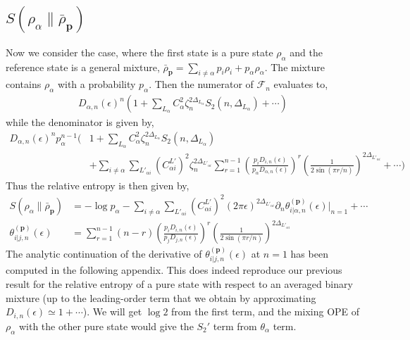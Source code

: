 \documentclass[11pt]{article}
\newcommand{\ep}{\epsilon}
\newcommand{\p}{\partial}
\newcommand{\nn}{\nonumber}
\newcommand{\lb}{\left(}
\newcommand{\rb}{\right)}
\begin{document}
\subsection{\texorpdfstring{$S(\rho_\alpha\|\bar{\rho}_\textbf{p})$}{S rho alpha wrt rho bar p}}
Now we consider the case, where the first state is a pure state $\rho_\alpha$ and the reference state is a general mixture, $\bar\rho_\textbf{p} =\displaystyle \sum_{i\neq \alpha} p_i\rho_i + p_\alpha \rho_\alpha$. The mixture contains $\rho_\alpha$ with a probability $p_\alpha$. 
Then the numerator of $\mathcal{F}_n$ evaluates to,
\begin{align}
    D_{\alpha,n}(\ep)^n \displaystyle\lb 1+ \sum_{L_{\alpha}}C_\alpha^2 \zeta_n^{2\Delta_{L_\alpha}}S_2(n,\Delta_{L_{\alpha}})+\cdots\rb
\end{align}
while the denominator is given by,
\begin{align}
    D_{\alpha,n}(\ep)^n p_\alpha^{n-1}\displaystyle\Bigg( &1 + \sum_{L_{\alpha}}C_\alpha^2 \zeta_n^{2\Delta_{L_{\alpha}}}S_2(n,\Delta_{L_{\alpha}}) \nn\\
    &+ \displaystyle\sum_{i\neq \alpha}\sum_{L'_{\alpha i}}\lb C_{\alpha i}^{L'}\rb^2\zeta_n^{2\Delta_{L'_{\alpha i}}} \sum_{r=1}^{n-1} \lb\frac{p_iD_{i,n}(\ep)}{p_\alpha D_{\alpha,n}(\ep)}\rb^{r} \lb\frac{1}{2\sin(\pi r/n)}\rb^{2\Delta_{L'_{\alpha i}}} +\cdots \Bigg)
\end{align}
Thus the relative entropy is then given by,
\begin{align}
    S(\rho_\alpha \| \bar\rho_\textbf{p}) &= -\log p_\alpha - \sum_{i\neq \alpha}\sum_{L'_{\alpha i}}\lb C_{\alpha i}^{L'}\rb^2 (2\pi \ep)^{2\Delta_{L'_{\alpha i}}} \p_n  \theta_{i|\alpha,n}^{(\textbf{p})}(\ep) \Big|_{n=1} +\cdots \\
    \theta_{i|j,n}^{(\textbf{p})}(\ep)  &= \sum_{r=1}^{n-1}(n-r) \lb\frac{p_iD_{i,n}(\ep)}{p_jD_{j,n}(\ep)}\rb^r \lb\frac{1}{2\sin (\pi r/n)}\rb^{2\Delta_{L'_{\alpha i}}}
\end{align}
The analytic continuation of the derivative of $\theta_{i|j,n}^{(\textbf{p})}(\ep)$ at $n=1$ has been computed in the following appendix. 
This does indeed reproduce our previous result for the relative entropy of a pure state with respect to an averaged binary mixture (up to the leading-order term that we obtain by approximating $D_{i,n}(\ep) \simeq 1 + \cdots$). We will get $\log 2$ from the first term, and the mixing OPE of $\rho_\alpha$ with the other pure state would give the $S_2'$ term from $\theta_\alpha$ term. 
\end{document}
